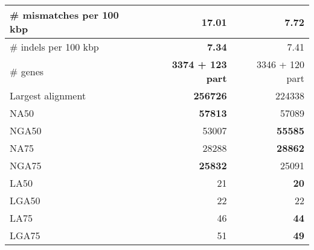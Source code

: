 \documentclass[12pt,a4paper]{article}
\begin{document}
\begin{table}[ht]
\begin{center}
\begin{tabular}{|l*{2}{|r}|}
\# mismatches per 100 kbp & 17.01 & {\bf 7.72} \\ \hline
\# indels per 100 kbp & {\bf 7.34} & 7.41 \\ \hline
\# genes & {\bf 3374 + 123 part} & 3346 + 120 part \\ \hline
Largest alignment & {\bf 256726} & 224338 \\ \hline
NA50 & {\bf 57813} & 57089 \\ \hline
NGA50 & 53007 & {\bf 55585} \\ \hline
NA75 & 28288 & {\bf 28862} \\ \hline
NGA75 & {\bf 25832} & 25091 \\ \hline
LA50 & 21 & {\bf 20} \\ \hline
LGA50 & 22 & 22 \\ \hline
LA75 & 46 & {\bf 44} \\ \hline
LGA75 & 51 & {\bf 49} \\ \hline
\end{tabular}
\end{center}
\end{table}
\end{document}
